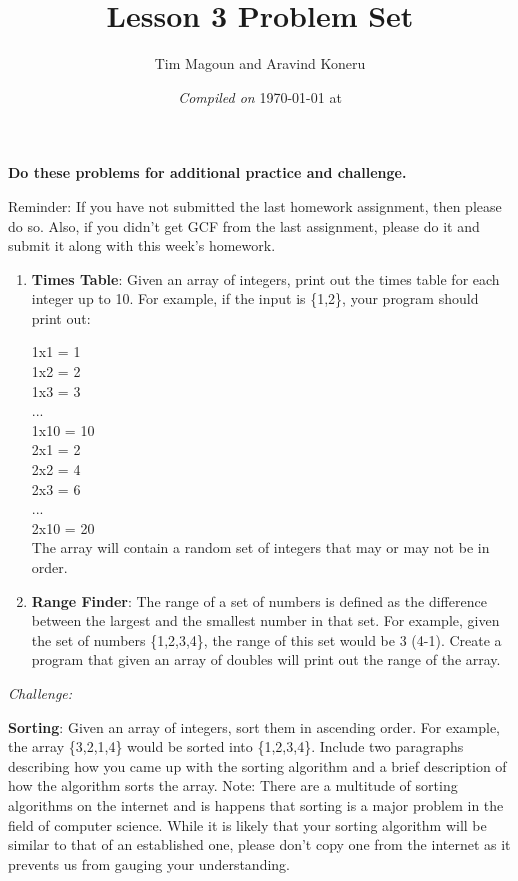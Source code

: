 \documentclass[11pt,fleqn]{article}
\begin{document}
\title{Lesson 3 Problem Set}%
\author{Tim Magoun and Aravind Koneru}
\date{\textit{Compiled on} \today \hspace{1mm} at \currenttime}
\maketitle

\begin{center}
\textbf{Do these problems for additional practice and challenge.}
\end{center}

Reminder: If you have not submitted the last homework assignment, then please do so. Also, if you
didn't get GCF from the last assignment, please do it and submit it along with this week's homework.

\begin{enumerate}
\item
\textbf{Times Table}: Given an array of integers, print out the times table for each integer up to
10. For example, if the input is \{1,2\}, your program should print out:

1x1 = 1\\
1x2 = 2\\
1x3 = 3\\
...\\
1x10 = 10\\
2x1 = 2\\
2x2 = 4\\
2x3 = 6\\
...\\
2x10 = 20\\

The array will contain a random set of integers that may or may not be in order. 

\item
\textbf{Range Finder}: The range of a set of numbers is defined as the difference between the
largest and the smallest number in that set. For example, given the set of numbers \{1,2,3,4\}, the
range of this set would be 3 (4-1). Create a program that given an array of doubles will print out
the range of the array. 

\end{enumerate}

\begin{center}
\textit{Challenge:}
\end{center}

\textbf{Sorting}: Given an array of integers, sort them in ascending order. For example, the array
\{3,2,1,4\} would be sorted into \{1,2,3,4\}. Include two paragraphs describing how you came up with
the sorting algorithm and a brief description of how the algorithm sorts the array. Note: There are a
multitude of sorting algorithms on the internet and is happens that sorting is a major problem in
the field of computer science. While it is likely that your sorting algorithm will be similar to
that of an established one, please don't copy one from the internet as it prevents us from gauging
your understanding. 
\end{document}
